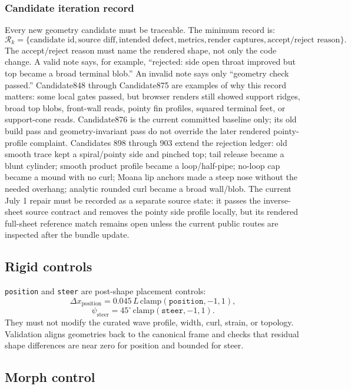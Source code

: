 \documentclass[12pt,letterpaper]{article}
\newcommand{\code}[1]{\texttt{#1}}
\begin{document}
\subsubsection{Candidate iteration record}

Every new geometry candidate must be traceable. The minimum record is:
\[
  \mathcal{R}_k=
  \{\text{candidate id},\text{source diff},\text{intended defect},\text{metrics},\text{render captures},\text{accept/reject reason}\}.
\]
The accept/reject reason must name the rendered shape, not only the code change. A valid note says, for example, ``rejected: side open throat improved but top became a broad terminal blob.'' An invalid note says only ``geometry check passed.'' Candidate848 through Candidate875 are examples of why this record matters: some local gates passed, but browser renders still showed support ridges, broad top blobs, front-wall reads, pointy fin profiles, squared terminal feet, or support-cone reads. Candidate876 is the current committed baseline only; its old build pass and geometry-invariant pass do not override the later rendered pointy-profile complaint. Candidates 898 through 903 extend the rejection ledger: old smooth trace kept a spiral/pointy side and pinched top; tail release became a blunt cylinder; smooth product profile became a loop/half-pipe; no-loop cap became a mound with no curl; Moana lip anchors made a steep nose without the needed overhang; analytic rounded curl became a broad wall/blob. The current July 1 repair must be recorded as a separate source state: it passes the inverse-sheet source contract and removes the pointy side profile locally, but its rendered full-sheet reference match remains open unless the current public routes are inspected after the bundle update.

\subsection{Rigid controls}

\code{position} and \code{steer} are post-shape placement controls:
\[
  \Delta x_{\mathrm{position}} = 0.045\,L\,\mathrm{clamp}(\code{position},-1,1),
\]
\[
  \psi_{\mathrm{steer}} = 45^\circ\,\mathrm{clamp}(\code{steer},-1,1).
\]
They must not modify the curated wave profile, width, curl, strain, or topology. Validation aligns geometries back to the canonical frame and checks that residual shape differences are near zero for position and bounded for steer.

\subsection{Morph control}
\end{document}

